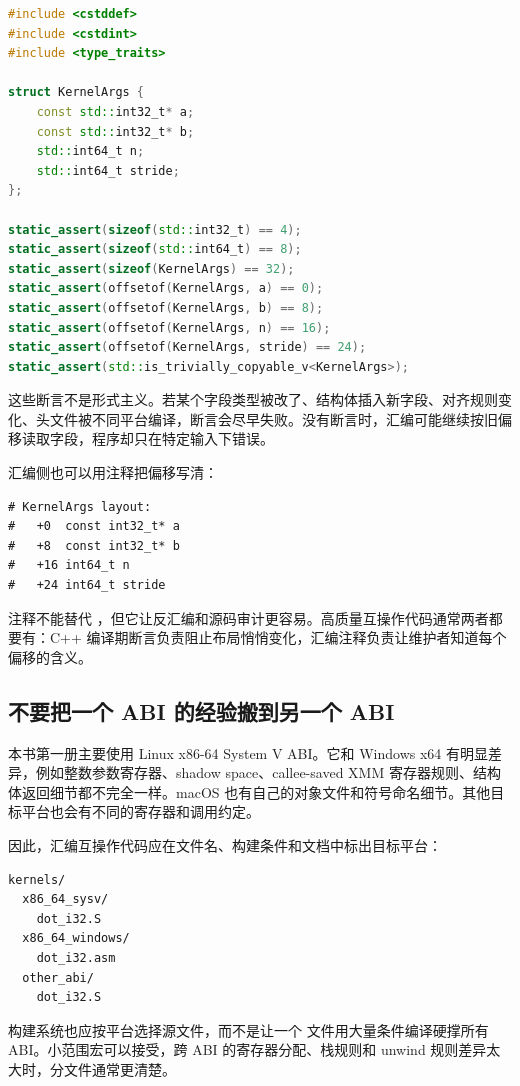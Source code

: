 \begin{lstlisting}[language=C++]
#include <cstddef>
#include <cstdint>
#include <type_traits>

struct KernelArgs {
    const std::int32_t* a;
    const std::int32_t* b;
    std::int64_t n;
    std::int64_t stride;
};

static_assert(sizeof(std::int32_t) == 4);
static_assert(sizeof(std::int64_t) == 8);
static_assert(sizeof(KernelArgs) == 32);
static_assert(offsetof(KernelArgs, a) == 0);
static_assert(offsetof(KernelArgs, b) == 8);
static_assert(offsetof(KernelArgs, n) == 16);
static_assert(offsetof(KernelArgs, stride) == 24);
static_assert(std::is_trivially_copyable_v<KernelArgs>);
\end{lstlisting}

这些断言不是形式主义。若某个字段类型被改了、结构体插入新字段、对齐规则变化、头文件被不同平台编译，断言会尽早失败。没有断言时，汇编可能继续按旧偏移读取字段，程序却只在特定输入下错误。

汇编侧也可以用注释把偏移写清：

\begin{lstlisting}
# KernelArgs layout:
#   +0  const int32_t* a
#   +8  const int32_t* b
#   +16 int64_t n
#   +24 int64_t stride
\end{lstlisting}

注释不能替代 ，但它让反汇编和源码审计更容易。高质量互操作代码通常两者都要有：C++ 编译期断言负责阻止布局悄悄变化，汇编注释负责让维护者知道每个偏移的含义。

\subsection{不要把一个 ABI 的经验搬到另一个 ABI}

本书第一册主要使用 Linux x86-64 System V ABI。它和 Windows x64 有明显差异，例如整数参数寄存器、shadow space、callee-saved XMM 寄存器规则、结构体返回细节都不完全一样。macOS 也有自己的对象文件和符号命名细节。其他目标平台也会有不同的寄存器和调用约定。

因此，汇编互操作代码应在文件名、构建条件和文档中标出目标平台：

\begin{lstlisting}
kernels/
  x86_64_sysv/
    dot_i32.S
  x86_64_windows/
    dot_i32.asm
  other_abi/
    dot_i32.S
\end{lstlisting}

构建系统也应按平台选择源文件，而不是让一个  文件用大量条件编译硬撑所有 ABI。小范围宏可以接受，跨 ABI 的寄存器分配、栈规则和 unwind 规则差异太大时，分文件通常更清楚。


